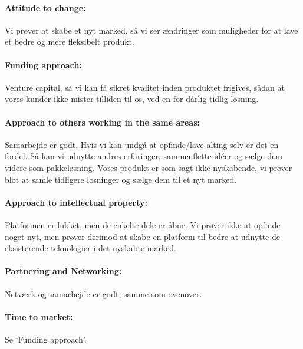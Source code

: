 \paragraph{Attitude to change:}
Vi prøver at skabe et nyt marked, så vi ser ændringer som muligheder for at lave et bedre og mere fleksibelt produkt.

\paragraph{Funding approach:} Venture capital, så vi kan få sikret kvalitet inden produktet frigives, sådan at vores kunder ikke mister tilliden til os, ved en for dårlig tidlig løsning.

\paragraph{Approach to others working in the same areas:} Samarbejde er godt.
Hvis vi kan undgå at opfinde/lave alting selv er det en fordel.
Så kan vi udnytte andres erfaringer, sammenflette idéer og sælge dem videre som pakkeløsning.
Vores produkt er som sagt ikke nyskabende, vi prøver blot at samle tidligere løsninger og sælge dem til et nyt marked.

\paragraph{Approach to intellectual property:} Platformen er lukket, men de enkelte dele er åbne.
Vi prøver ikke at opfinde noget nyt, men prøver derimod at skabe en platform til bedre at udnytte de eksisterende teknologier i det nyskabte marked.

\paragraph{Partnering and Networking:} Netværk og samarbejde er godt, samme som ovenover.

\paragraph{Time to market:} Se `Funding approach'.

